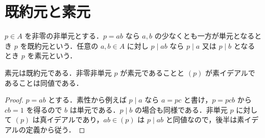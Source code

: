 \section{既約元と素元}
\begin{defn}[既約元と素元]
$p\in A$ を非零の非単元とする．$p=ab$ なら $a,b$ の少なくとも一方が単元となるとき $p$ を既約元という．任意の $a,b\in A$ に対し $p\mid ab$ なら $p\mid a$ 又は $p\mid b$ となるとき $p$ を素元という．
\end{defn}
\begin{prop}[素元と既約元の関係]
素元は既約元である．非零非単元 $p$ が素元であることと $(p)$ が素イデアルであることは同値である．
\end{prop}
\begin{proof}
$p=ab$ とする．素性から例えば $p\mid a$ なら $a=pc$ と書け，$p=pcb$ から $cb=1$ を得るので $b$ は単元である．$p\mid b$ の場合も同様である．非単元 $p$ に対して $(p)$ は真イデアルであり，$ab\in(p)$ は $p\mid ab$ と同値なので，後半は素イデアルの定義から従う．
\end{proof}
